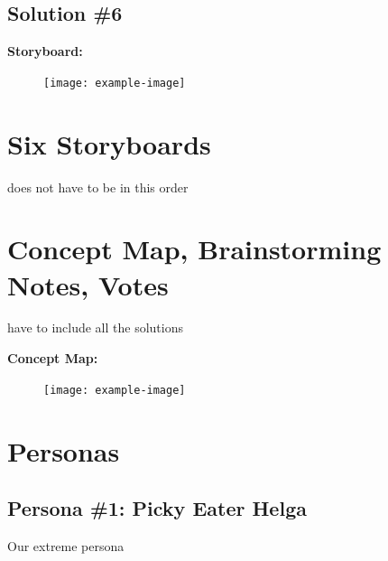 \documentclass[a4paper,10pt,oneside]{scrreprt}
\begin{document}
		\subsection{Solution \#6}
		
			\noindent \textbf{Storyboard:}\\
			
			\begin{figure}[H]
				\centering
				\texttt{[image: example-image]}
			\end{figure}
		
		\bigskip
		
	\section{Six Storyboards}
		does not have to be in this order
		
	\section{Concept Map, Brainstorming Notes, Votes}
		have to include all the solutions
		
			\noindent \textbf{Concept Map:}\\
			
			\begin{figure}[H]
				\centering
				\texttt{[image: example-image]}
			\end{figure}
		
	
	\section{Personas}
	
		\subsection{Persona \#1: Picky Eater Helga}
		
		Our extreme persona
		
\end{document}
